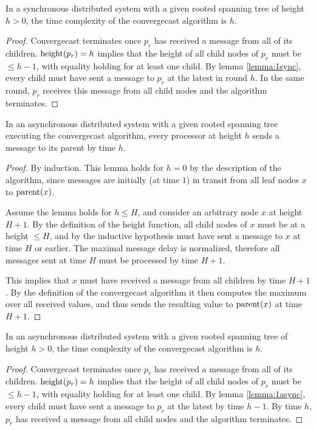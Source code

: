 \begin{theorem}
In a synchronous distributed system with a given rooted spanning tree of height $h > 0$, the time
complexity of the convergecast algorithm is $h$.
\end{theorem}

\begin{proof}
Convergecast terminates once $p_r$ has received a message from all of its children.
$\text{height}(p_r) = h$ implies that the height of all child nodes of $p_r$ must be
$\leq h - 1$, with equality holding for at least one child. By lemma \ref{lemma:1sync},
every child must have sent a message to $p_r$ at the latest in round $h$. In the 
same round, $p_r$ receives this message from all child nodes and the algorithm terminates.
\end{proof}

\begin{lemma} \label{lemma:1async}
In an asynchronous distributed system with a given rooted spanning tree executing the convergecast
algorithm, every processor at height $h$ sends a message to its parent by time $h$.
\end{lemma}

\begin{proof}
By induction. This lemma holds for $h = 0$ by the description of the algorithm, since
messages are initially (at time $1$) in transit from all leaf nodes $x$ to $\text{parent}(x)$.

Assume the lemma holds for $h \leq H$, and consider an arbitrary node $x$ at height
$H + 1$. By the definition of the height function, all child nodes of $x$ must be at
a height $\leq H$, and by the inductive hypothesis must have sent a message to
$x$ at time $H$ or earlier.
The maximal message delay is normalized, therefore all messages sent at time $H$
must be processed by time $H + 1$.

This implies that $x$ must have received
a message from all children by time $H + 1$. By the definition of the
convergecast algorithm it then computes the maximum over all received values, and
thus sends the resulting value to $\text{parent}(x)$ at time $H + 1$.
\end{proof}

\begin{theorem}
In an asynchronous distributed system with a given rooted spanning tree of height $h > 0$, the time
complexity of the convergecast algorithm is $h$.
\end{theorem}

\begin{proof}
Convergecast terminates once $p_r$ has received a message from all of its children.
$\text{height}(p_r) = h$ implies that the height of all child nodes of $p_r$ must be
$\leq h - 1$, with equality holding for at least one child. By lemma \ref{lemma:1async},
every child must have sent a message to $p_r$ at the latest by time $h - 1$. By time
$h$, $p_r$ has received a message from all child nodes and the algorithm terminates.
\end{proof}

